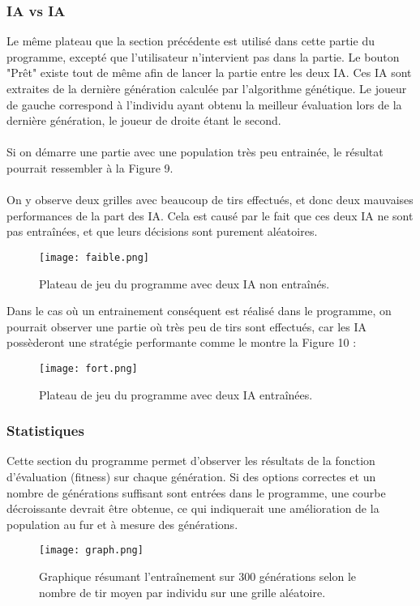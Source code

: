 \documentclass[12pt]{report}
\begin{document}
	\subsubsection{IA vs IA}
	Le même plateau que la section précédente est utilisé dans cette partie du programme, excepté que l'utilisateur n'intervient pas dans la partie. Le bouton "Prêt" existe tout de même afin de lancer la partie entre les deux IA. Ces IA sont extraites de la dernière génération calculée par l'algorithme génétique. Le joueur de gauche correspond à l'individu ayant obtenu la meilleur évaluation lors de la dernière génération, le joueur de droite étant le second.\\\\
	Si on démarre une partie avec une population très peu entrainée, le résultat pourrait ressembler à la Figure 9.\\\\
	On y observe deux grilles avec beaucoup de tirs effectués, et donc deux mauvaises performances de la part des IA. Cela est causé par le fait que ces deux IA ne sont pas entraînées, et que leurs décisions sont purement aléatoires.\\
	\newpage
	\begin{figure}[h]
    	\begin{center}
		\texttt{[image: faible.png]}
		\caption{Plateau de jeu du programme avec deux IA non entraînés.}
		\end{center}
	\end{figure}
	\noindent Dans le cas où un entrainement conséquent est réalisé dans le programme, on pourrait observer une partie où très peu de tirs sont effectués, car les IA possèderont une stratégie performante comme le montre la Figure 10 :
	\begin{figure}[h]
    	\begin{center}
		\texttt{[image: fort.png]}
		\caption{Plateau de jeu du programme avec deux IA entraînées.}
		\end{center}
	\end{figure}
\newpage
	\subsubsection{Statistiques}
	Cette section du programme permet d'observer les résultats de la fonction d'évaluation (fitness) sur chaque génération. Si des options correctes et un nombre de générations suffisant sont entrées dans le programme, une courbe décroissante devrait être obtenue, ce qui indiquerait une amélioration de la population au fur et à mesure des générations.
	\begin{figure}[h]
		\captionsetup{justification=centering}
    	\begin{center}
		\texttt{[image: graph.png]}
		\caption{Graphique résumant l'entraînement sur 300 générations selon le nombre de tir moyen par individu sur une grille aléatoire.}
		\end{center}
	\end{figure}
\end{document}
